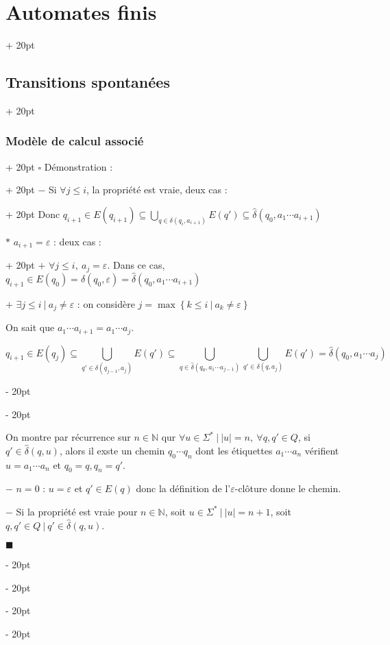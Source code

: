 \documentclass[a4paper, 12pt, twoside]{article}
\newcommand{\N}{\mathbb{N}} %
\newcommand{\set}[1]{\left\{ #1 \right\}}
\newcommand{\abs}[1]{\left\lvert #1 \right\rvert}
\renewcommand{\le}{\leqslant}
\newcommand{\ind}[1][20pt]{\advance\leftskip + #1}
\newcommand{\deind}[1][20pt]{\advance\leftskip - #1}
\newenvironment{indt}[2][20pt]{#2 \par \ind[#1]}{\par \deind} %
\newenvironment{proof}[1][{Démonstration :}]{\begin{indt}{$\square$ #1}}{$\blacksquare$ \end{indt}}
\begin{document}
\begin{indt}{\section{Automates finis}}
\begin{indt}{\subsection{Transitions spontanées}}
\begin{indt}{\subsubsection{Modèle de calcul associé}}
\begin{proof}
\begin{indt}{$-$ Si $\forall j \le i$, la propriété est vraie, deux cas :}
                        Donc $q_{i + 1} \in E(q_{i + 1}) \subseteq \displaystyle \bigcup_{q \in \delta(q_i, a_{i + 1})} E(q') \subseteq \hat \delta(q_0, a_1 \cdots a_{i + 1})$

                        \vspace{6pt}
                        
                        \begin{indt}{$*$ $a_{i + 1} = \varepsilon$ : deux cas :}
                            $+$ $\forall j \le i,\ a_j = \varepsilon$. Dans ce cas, $q_{i + 1} \in E(q_0) = \hat \delta(q_0, \varepsilon) = \hat \delta(q_0, a_1 \cdots a_{i + 1})$

                            $+$ $\exists j \le i\ |\ a_j \neq \varepsilon$ : on considère $j = \max \set{k \le i\ |\ a_k \neq \varepsilon}$

                            On sait que $a_1 \cdots a_{i+1} = a_1 \cdots a_j$.

                            \[
                                q_{i + 1} \in E(q_j)
                                \subseteq \bigcup_{q' \in \delta(q_{j - 1}, a_j)} E(q')
                                \subseteq \bigcup_{q \in \hat \delta(q_0, a_1 \cdots a_{j - 1})} \bigcup_{q' \in \delta (q, a_j)} E(q')
                                = \hat \delta(q_0, a_1 \cdots a_j)
                            \]
                        \end{indt}
                    \end{indt}

                    \vspace{12pt}
                    
                    \boxed{\rm \Rightarrow} On montre par récurrence sur $n \in \N$ qur $\forall u \in \Sigma^*\ |\ \abs u = n,\ \forall q, q' \in Q$, si $q' \in \hat \delta(q, u)$, alors il exste un chemin $q_0 \cdots q_n$ dont les étiquettes $a_1 \cdots a_n$ vérifient $u = a_1 \cdots a_n$ et $q_0 = q, q_n = q'$.

                    \vspace{6pt}
                    
                    $-$ $n = 0$ : $u = \varepsilon$ et $q' \in E(q)$ donc la définition de l'$\varepsilon$-clôture donne le chemin.

                    \vspace{6pt}
                    
                    $-$ Si la propriété est vraie pour $n \in \N$, soit $u \in \Sigma^*\ |\ \abs u = n + 1$, soit $q, q' \in Q\ |\ q' \in \hat \delta(q, u)$.


\end{proof}
\end{indt}
\end{indt}
\end{indt}
\end{document}
